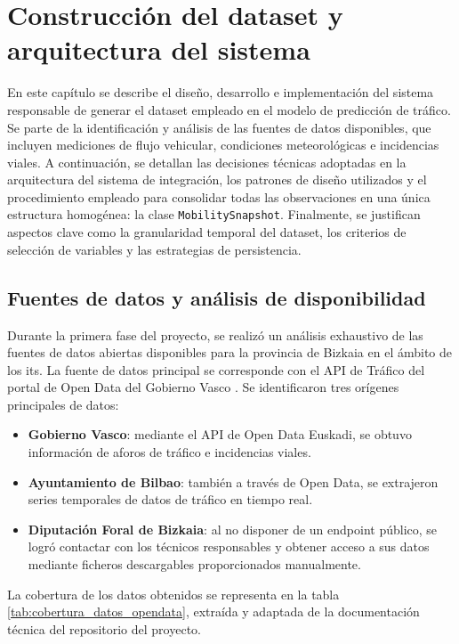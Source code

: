 \section{Construcción del dataset y arquitectura del sistema}
\label{sec:dataset_arquitectura}

En este capítulo se describe el diseño, desarrollo e implementación del sistema responsable de generar el dataset empleado en el modelo de predicción de tráfico. Se parte de la identificación y análisis de las fuentes de datos disponibles, que incluyen mediciones de flujo vehicular, condiciones meteorológicas e incidencias viales. A continuación, se detallan las decisiones técnicas adoptadas en la arquitectura del sistema de integración, los patrones de diseño utilizados y el procedimiento empleado para consolidar todas las observaciones en una única estructura homogénea: la clase \texttt{MobilitySnapshot}. Finalmente, se justifican aspectos clave como la granularidad temporal del dataset, los criterios de selección de variables y las estrategias de persistencia.


\subsection{Fuentes de datos y análisis de disponibilidad}

Durante la primera fase del proyecto, se realizó un análisis exhaustivo de las fuentes de datos abiertas disponibles para la provincia de Bizkaia en el ámbito de los \acrshort{its}. La fuente de datos principal se corresponde con el API de Tráfico del portal de Open Data del Gobierno Vasco \cite{apiTraffic}. Se identificaron tres orígenes principales de datos:

\begin{itemize}
	\item \textbf{Gobierno Vasco}: mediante el API de Open Data Euskadi, se obtuvo información de aforos de tráfico e incidencias viales.
	\item \textbf{Ayuntamiento de Bilbao}: también a través de Open Data, se extrajeron series temporales de datos de tráfico en tiempo real.
	\item \textbf{Diputación Foral de Bizkaia}: al no disponer de un endpoint público, se logró contactar con los técnicos responsables y obtener acceso a sus datos mediante ficheros descargables proporcionados manualmente.
\end{itemize}

La cobertura de los datos obtenidos se representa en la tabla \ref{tab:cobertura_datos_opendata}, extraída y adaptada de la documentación técnica del repositorio del proyecto.

